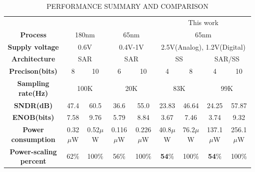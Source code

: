 \begin{table}[htbp]
	\caption{PERFORMANCE SUMMARY AND COMPARISON}
	\begin{center}
		\begin{tabular}{|c|c|c|c|c|c|c|c|c|}
			\hline
			\textbf{}& \multicolumn{2}{|c|}{\cite{zhu_06_2013}} & \multicolumn{2}{|c|}{\cite{yip_resolution-reconfigurable_2013}} & \multicolumn{4}{|c|}{This work} \\
			\hhline{|=========|}
			\textbf{Process}& \multicolumn{2}{|c|}{180nm} & \multicolumn{2}{|c|}{65nm} & \multicolumn{4}{|c|}{65nm} \\
			\hline 
			\textbf{Supply voltage}& \multicolumn{2}{|c|}{0.6V} & \multicolumn{2}{|c|}{0.4V-1V} & \multicolumn{4}{|c|}{2.5V(Analog), 1.2V(Digital)} \\
			\hline
			
			\textbf{Architecture}& \multicolumn{2}{|c|}{SAR} & \multicolumn{2}{|c|}{SAR} & \multicolumn{2}{|c|}{SS} & \multicolumn{2}{|c|}{SAR/SS}\\
			\hline
			\textbf{Precison(bits)} & 8 & 10 & 6 & 10 & 4 & 8 & 4 & 10 \\
			\hline
			\textbf{Sampling rate(Hz)}& \multicolumn{2}{|c|}{100K} & \multicolumn{2}{|c|}{20K} & \multicolumn{2}{|c|}{83K} & \multicolumn{2}{|c|}{99K} \\
			\hline
			\textbf{SNDR(dB)} & 47.4 & 60.5 & 36.6 & 55.0 & 23.83 & 46.64 & 24.25 & 57.87 \\
			\hline
			\textbf{ENOB(bits)}& 7.58 & 9.76 & 5.79 & 8.84 & 3.67 & 7.46 & 3.74 & 9.32 \\
			\hline
			\textbf{Power consumption}& 0.32$\mu$W & 0.52$\mu$W &  0.116$\mu$W & 0.226$\mu$W & 40.8$\mu$W & 76.2$\mu$W & 137.1$\mu$W & 256.1$\mu$W\\
			\hline
			\textbf{Power-scaling percent}& 62\% & 100\% & 56\% & 100\% & \textbf{54}\% & 100\% & \textbf{54}\% & 100\% \\
			\hline
		\end{tabular}
		\label{tab1}
	\end{center}
\end{table}

